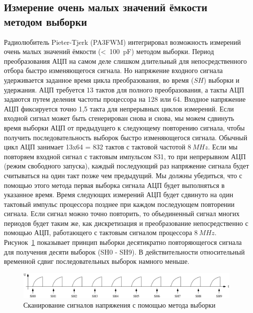 \subsection{Измерение очень малых значений ёмкости методом выборки}
Радиолюбитель Pieter-Tjerk (PA3FWM) интегрировал возможность измерений очень малых значений ёмкости (\textless~100~pF)
методом выборки.
Период преобразования АЦП на самом деле слишком длительный для непосредственного отбора быстро изменяющегося сигнала.
Но напряжение входного сигнала удерживается заданное время цикла преобразования, во время (\(SH\)) выборки и удержания.
АЦП требуется 13 тактов для полного преобразования, а такты АЦП задаются путем деления частоты процессора на 128 или 64.
Входное напряжение АЦП фиксируется точно 1,5 такта для непрерывных циклов измерений.
Если входной сигнал может быть сгенерирован снова и снова, мы можем сдвинуть время выборки АЦП от предыдущего к 
следующему повторению сигнала, чтобы получить последовательность выборок быстро изменяющегося сигнала.
Обычный цикл АЦП занимает 13x64 = 832 тактов с тактовой частотой \(8~MHz\).
Если мы повторяем входной сигнал с тактовым импульсом 831, то при непрерывном АЦП (режим свободного запуска),
каждый последующий раз напряжение сигнала будет считываться на один такт позже чем предыдущий.
Мы должны убедиться, что с помощью этого метода первая выборка сигнала АЦП будет выполняться в указанное время.
Время следующих измерений АЦП будет сдвинуто на один тактовый импульс процессора позднее при каждом последующем
повторении сигнала.
Если сигнал можно точно повторить, то объединенный сигнал многих периодов будет таким же, как дискретизация и
преобразование непосредственно с помощью АЦП, работающего с тактовым сигналом процессора \(8~MHz\).
Рисунок~\ref{fig:sampling} показывает принцип выборки десятикратно повторяющегося сигнала для получения
десяти выборок (SH0 - SH9).
В действительности относительный временной сдвиг последовательных выборок намного меньше.


\begin{figure}[H]
\centering
\includegraphics[width=1.\textwidth]{../FIG/sampling.pdf}
\caption{Сканирование сигналов напряжения с помощью метода выборки}
\label{fig:sampling}
\end{figure}

